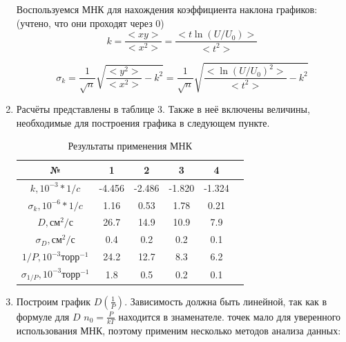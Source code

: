 \documentclass[a4paper,12pt]{article}
\begin{document}
\begin{enumerate}
Воспользуемся МНК для нахождения коэффициента наклона графиков: (учтено, что они проходят через 0)
\begin{equation}
    k = \frac{<xy>}{<x^2>} = \frac{<t\ln(U/U_0)>}{<t^2>}
\end{equation}

\begin{equation}
    \sigma_k = \frac{1}{\sqrt{n}}\sqrt{\frac{<y^2>}{<x^2>} - k^2} =
    \frac{1}{\sqrt{n}}\sqrt{\frac{<\ln(U/U_0)^2>}{<t^2>} - k^2}
\end{equation}

\item Расчёты представлены в таблице 3. Также в неё включены величины, необходимые для построения графика в следующем пункте.
\begin{center}
 \begin{table}[hb]
    \centering
    \caption{Результаты применения МНК}
    \begin{tabular}{|c|c|c|c|c|c|}
    \hline
    № & 1 & 2 & 3 & 4 \\ \hline
    $k, 10^{-3} * 1/c$ & -4.456 & -2.486 & -1.820 & -1.324 \\ \hline
    $\sigma_k, 10^{-6}*1/c$ & 1.16 & 0.53 & 1.78  & 0.21 \\ \hline
    $D, \text{см}^2/\text{с}$ & 26.7 & 14.9 & 10.9 & 7.9 \\ \hline
    $\sigma_D, \text{см}^2/\text{с}$ & 0.4 & 0.2 & 0.2 & 0.1 \\ \hline
    $ 1/P, 10^{-3}\text{торр}^{-1}$ & 24.2 & 12.7 & 8.3 & 6.2 \\ \hline
    $ \sigma_{1/P}, 10^{-3}\text{торр}^{-1}$ & 1.8 & 0.5 & 0.2 & 0.1 \\ \hline
    \end{tabular}
    \end{table}
\end{center}


\item Построим график $D(\frac{1}{P})$. \newline
Зависимость должна быть линейной, так как в формуле для $D$ $n_0 = \frac{P}{kT}$ находится в знаменателе.  точек мало для уверенного использования МНК, поэтому применим несколько методов анализа данных:


\end{enumerate}
\end{document}
